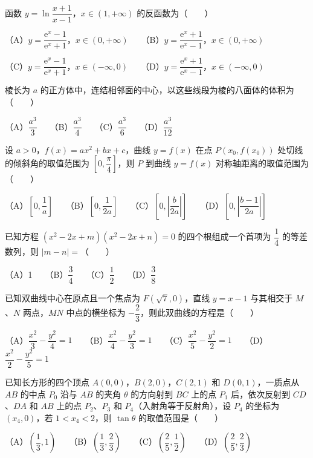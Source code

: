 \begin{question}
函数 $y = \ln\dfrac{x+1}{x-1}$，$x \in (1, +\infty)$ 的反函数为\mbox{（　　）}

（A）$y = \dfrac{\mathrm{e}^x - 1}{\mathrm{e}^x + 1}$，$x \in (0, +\infty)$　　（B）$y = \dfrac{\mathrm{e}^x + 1}{\mathrm{e}^x - 1}$，$x \in (0, +\infty)$

（C）$y = \dfrac{\mathrm{e}^x - 1}{\mathrm{e}^x + 1}$，$x \in (-\infty, 0)$　　（D）$y = \dfrac{\mathrm{e}^x + 1}{\mathrm{e}^x - 1}$，$x \in (-\infty, 0)$

\end{question}
\begin{question}
棱长为 $a$ 的正方体中，连结相邻面的中心，以这些线段为棱的八面体的体积为\mbox{（　　）}

（A）$\dfrac{a^3}{3}$　　（B）$\dfrac{a^3}{4}$　　（C）$\dfrac{a^3}{6}$　　（D）$\dfrac{a^3}{12}$

\end{question}
\begin{question}
设 $a > 0$，$f(x) = ax^2 + bx + c$，曲线 $y = f(x)$ 在点 $P(x_0, f(x_0))$ 处切线的倾斜角的取值范围为 $\left[0, \dfrac{\pi}{4}\right]$，则 $P$ 到曲线 $y = f(x)$ 对称轴距离的取值范围为\mbox{（　　）}

（A）$\left[0, \dfrac{1}{a}\right]$　　（B）$\left[0, \dfrac{1}{2a}\right]$　　（C）$\left[0, \left|\dfrac{b}{2a}\right|\right]$　　（D）$\left[0, \left|\dfrac{b-1}{2a}\right|\right]$

\end{question}
\begin{question}
已知方程 $(x^2 - 2x + m)(x^2 - 2x + n) = 0$ 的四个根组成一个首项为 $\dfrac{1}{4}$ 的等差数列，则 $|m - n| = $\mbox{（　　）}

（A）1　　（B）$\dfrac{3}{4}$　　（C）$\dfrac{1}{2}$　　（D）$\dfrac{3}{8}$

\end{question}
\begin{question}
已知双曲线中心在原点且一个焦点为 $F(\sqrt{7}, 0)$，直线 $y = x - 1$ 与其相交于 $M$、$N$ 两点，$MN$ 中点的横坐标为 $-\dfrac{2}{3}$，则此双曲线的方程是\mbox{（　　）}

（A）$\dfrac{x^2}{3} - \dfrac{y^2}{4} = 1$　　（B）$\dfrac{x^2}{4} - \dfrac{y^2}{3} = 1$　　（C）$\dfrac{x^2}{5} - \dfrac{y^2}{2} = 1$　　（D）$\dfrac{x^2}{2} - \dfrac{y^2}{5} = 1$

\end{question}
\begin{question}
已知长方形的四个顶点 $A(0, 0)$，$B(2, 0)$，$C(2, 1)$ 和 $D(0, 1)$，一质点从 $AB$ 的中点 $P_0$ 沿与 $AB$ 的夹角 $\theta$ 的方向射到 $BC$ 上的点 $P_1$ 后，依次反射到 $CD$、$DA$ 和 $AB$ 上的点 $P_2$、$P_3$ 和 $P_4$（入射角等于反射角），设 $P_4$ 的坐标为 $(x_4, 0)$，若 $1 < x_4 < 2$，则 $\tan\theta$ 的取值范围是\mbox{（　　）}

（A）$\left(\dfrac{1}{3}, 1\right)$　　（B）$\left(\dfrac{1}{3}, \dfrac{2}{3}\right)$　　（C）$\left(\dfrac{2}{5}, \dfrac{1}{2}\right)$　　（D）$\left(\dfrac{2}{5}, \dfrac{2}{3}\right)$

\end{question}
